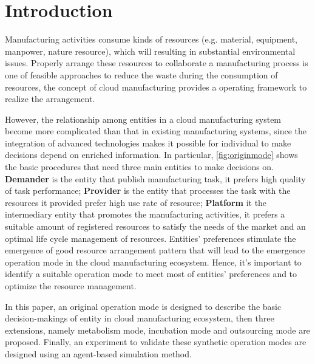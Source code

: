 \section{Introduction}
Manufacturing activities consume kinds of resources (e.g. material, equipment, manpower, nature resource), which will resulting in substantial environmental issues. Properly arrange these resources to collaborate a manufacturing process is one of feasible approaches to reduce the waste during the consumption of resources, the concept of cloud manufacturing \cite{li2010cloud,Xu2012} provides a operating framework to realize the arrangement.

However, the relationship among entities in a cloud manufacturing system become more complicated than that in existing manufacturing systems, since the integration of advanced technologies makes it possible for individual to make decisions depend on enriched information.
In particular, \autoref{fig:originmode} shows the basic procedures that need three main entities to make decisions on. \textbf{Demander} is the entity that publish manufacturing task, it prefers high quality of task performance; \textbf{Provider} is the entity that processes the task with the resources it provided prefer high use rate of resource; \textbf{Platform} it the intermediary entity that promotes the manufacturing activities, it prefers a suitable amount of registered resources to satisfy the needs of the market and an optimal life cycle management of resources. Entities' preferences stimulate the emergence of good resource arrangement pattern that will lead to the emergence operation mode in the cloud manufacturing ecosystem. Hence, it's important to identify a suitable operation mode to meet most of entities' preferences and to optimize the resource management.

In this paper, an original operation mode is designed to describe the basic decision-makings of entity in cloud manufacturing ecosystem, then three extensions, namely metabolism mode, incubation mode and outsourcing mode are proposed. Finally, an experiment to validate these synthetic operation modes are designed using an agent-based simulation method.
